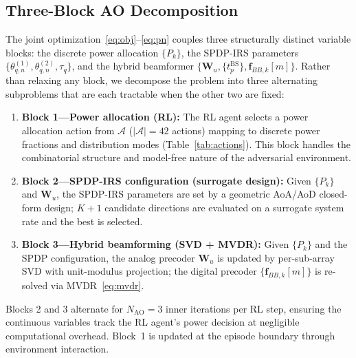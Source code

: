 \documentclass[journal,twocolumn]{IEEEtran}
\newcommand{\vect}[1]{\mathbf{#1}}
\newcommand{\mat}[1]{\mathbf{#1}}
\begin{document}
\subsection{Three-Block AO Decomposition}

The joint optimization~\eqref{eq:obj}--\eqref{eq:pn} couples three structurally distinct variable blocks: the discrete power allocation $\{P_k\}$, the SPDP-IRS parameters $\{\theta_{q,n}^{(1)}, \theta_{q,n}^{(2)}, \tau_q\}$, and the hybrid beamformer $\{\mat{W}_u, \{t_p^{\text{BS}}\}, \vect{f}_{BB,k}[m]\}$. Rather than relaxing any block, we decompose the problem into three alternating subproblems that are each tractable when the other two are fixed:

\begin{enumerate}
\item \textbf{Block 1---Power allocation (RL):} The RL agent selects a power allocation action from $\mathcal{A}$ ($|\mathcal{A}|=42$ actions) mapping to discrete power fractions and distribution modes (Table~\ref{tab:actions}). This block handles the combinatorial structure and model-free nature of the adversarial environment.
\item \textbf{Block 2---SPDP-IRS configuration (surrogate design):} Given $\{P_k\}$ and $\mat{W}_u$, the SPDP-IRS parameters are set by a geometric AoA/AoD closed-form design; $K+1$ candidate directions are evaluated on a surrogate system rate and the best is selected.
\item \textbf{Block 3---Hybrid beamforming (SVD + MVDR):} Given $\{P_k\}$ and the SPDP configuration, the analog precoder $\mat{W}_u$ is updated by per-sub-array SVD with unit-modulus projection; the digital precoder $\{\vect{f}_{BB,k}[m]\}$ is re-solved via MVDR~\eqref{eq:mvdr}.
\end{enumerate}

Blocks 2 and 3 alternate for $N_{\text{AO}}=3$ inner iterations per RL step, ensuring the continuous variables track the RL agent's power decision at negligible computational overhead. Block~1 is updated at the episode boundary through environment interaction.
\end{document}
